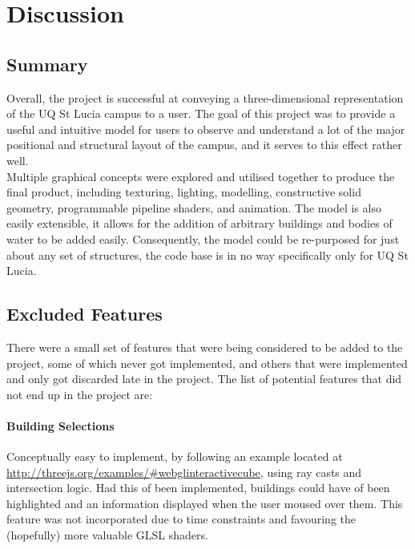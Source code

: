 \section{Discussion} %
\label{sec:discussion}
    \subsection{Summary} %
    \label{sub:summary}
        Overall, the project is successful at conveying a three-dimensional representation of the UQ St Lucia campus to a user.
        The goal of this project was to provide a useful and intuitive model for users to observe and understand a lot of the major positional and structural layout of the campus, and it serves to this effect rather well.\\

        Multiple graphical concepts were explored and utilised together to produce the final product, including texturing, lighting, modelling, constructive solid geometry, programmable pipeline shaders, and animation.
        The model is also easily extensible, it allows for the addition of arbitrary buildings and bodies of water to be added easily.
        Consequently, the model could be re-purposed for just about any set of structures, the code base is in no way specifically only for UQ St Lucia.

    \subsection{Excluded Features} %
    \label{sub:excluded_features}
        There were a small set of features that were being considered to be added to the project, some of which never got implemented, and others that were implemented and only got discarded late in the project.
        The list of potential features that did not end up in the project are:

        \paragraph{Building Selections} %
        \label{par:building_selections}
            Conceptually easy to implement, by following an example located at
            \href{http://threejs.org/examples/#webgl_interactive_cubes}{http://threejs.org/examples/\#webgl{\textunderscore}interactive{\textunderscore}cube}, using ray casts and intersection logic.
            Had this of been implemented, buildings could have of been highlighted and an information displayed when the user moused over them.
            This feature was not incorporated due to time constraints and favouring the (hopefully) more valuable GLSL shaders.\\

